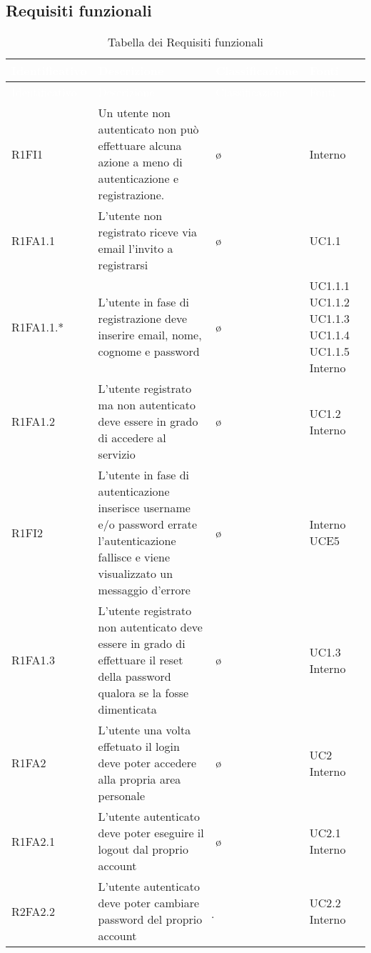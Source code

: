\subsection{Requisiti funzionali}
    {
        \renewcommand{\arraystretch}{1.5}
        
        \begin{longtable}{ l p{7cm} l p{3cm}}
            \caption{Tabella dei Requisiti funzionali}\\
            \rowcolor{darkblue}
            \textcolor{white}{Identificativo} & \textcolor{white}{Descrizione} & \textcolor{white}{Classificazione} & \textcolor{white}{Fonti}\\	
            \endfirsthead
            \rowcolor{darkblue}
            \textcolor{white}{Identificativo} & \textcolor{white}{Descrizione} & \textcolor{white}{Classificazione} & \textcolor{white}{Fonti}\\
            \endhead
            R1FI1 & Un utente non autenticato non può effettuare alcuna azione a meno di autenticazione e registrazione. & \o & Interno\\
            R1FA1.1& L'utente non registrato riceve via email l'invito a registrarsi & \o & UC1.1\\
            R1FA1.1.* & L'utente in fase di registrazione deve inserire email, nome, cognome e password & \o & UC1.1.1 UC1.1.2 UC1.1.3 UC1.1.4 UC1.1.5 Interno\\
            R1FA1.2 & L'utente registrato ma non autenticato deve essere in grado di accedere al servizio & \o & UC1.2 Interno\\
            R1FI2 & L'utente in fase di autenticazione inserisce username e/o password errate l'autenticazione fallisce e viene visualizzato un messaggio d'errore & \o & Interno UCE5\\
            R1FA1.3 & L'utente registrato non autenticato deve essere in grado di effettuare il reset della password qualora se la fosse dimenticata & \o & UC1.3 Interno\\
            R1FA2 & L'utente una volta effetuato il login deve poter accedere alla propria area personale & \o & UC2 Interno\\
            R1FA2.1 & L'utente autenticato deve poter eseguire il logout dal proprio account & \o & UC2.1 Interno\\
            R2FA2.2 & L'utente autenticato deve poter cambiare password del proprio account & \d & UC2.2 Interno\\

\end{longtable}}
